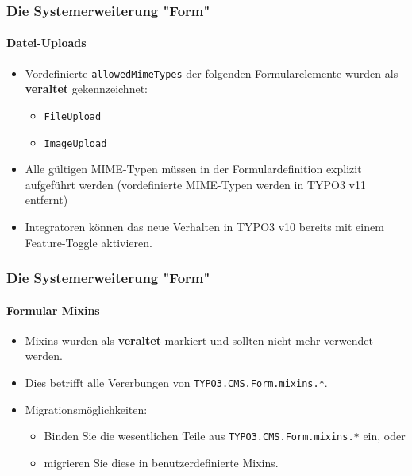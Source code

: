 
\begin{frame}[fragile]
	\frametitle{Die Systemerweiterung "Form"}
	\framesubtitle{Datei-Uploads}

	\begin{itemize}
		\item Vordefinierte \texttt{allowedMimeTypes} der folgenden Formularelemente wurden als \textbf{veraltet} gekennzeichnet:

			\begin{itemize}
				\item \texttt{FileUpload}
				\item \texttt{ImageUpload}
			\end{itemize}

		\item Alle gültigen MIME-Typen müssen in der Formulardefinition explizit aufgeführt werden \newline
			\smaller
				(vordefinierte MIME-Typen werden in TYPO3 v11 entfernt)
			\normalsize

		\item Integratoren können das neue Verhalten in TYPO3 v10 bereits mit einem Feature-Toggle aktivieren.

	\end{itemize}

\end{frame}


\begin{frame}[fragile]
	\frametitle{Die Systemerweiterung "Form"}
	\framesubtitle{Formular Mixins}

	\begin{itemize}
		\item Mixins wurden als \textbf{veraltet} markiert und sollten nicht mehr verwendet werden.
		\item Dies betrifft alle Vererbungen von \texttt{TYPO3.CMS.Form.mixins.*}.
		\item Migrationsmöglichkeiten:

			\begin{itemize}
				\item Binden Sie die wesentlichen Teile aus \texttt{TYPO3.CMS.Form.mixins.*} ein, oder
				\item migrieren Sie diese in benutzerdefinierte Mixins.
			\end{itemize}

	\end{itemize}

\end{frame}

